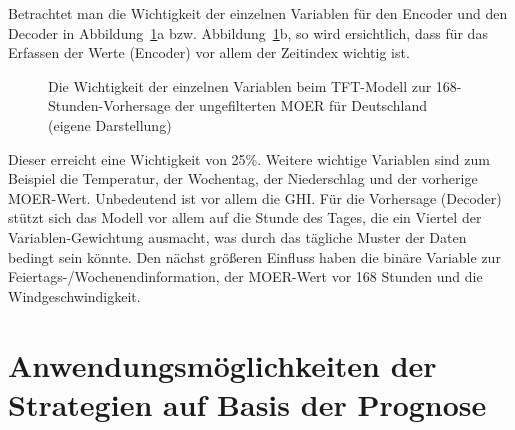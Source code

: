 Betrachtet man die Wichtigkeit der einzelnen Variablen für den Encoder und den Decoder in Abbildung~\ref{FIG:encoder-decoder-interpretation}a bzw. Abbildung~\ref{FIG:encoder-decoder-interpretation}b, so wird ersichtlich, dass für das Erfassen der Werte (Encoder) vor allem der Zeitindex wichtig ist.
\begin{figure}
 \centering
 \qquad
 \caption[TFT Vorhersage Einfluss einzelner Variablen]{Die Wichtigkeit der einzelnen Variablen beim \ac{TFT}-Modell zur 168-Stunden-Vorhersage der ungefilterten \ac{MOER} für Deutschland (eigene Darstellung)}
 \label{FIG:encoder-decoder-interpretation}%
\end{figure}
Dieser erreicht eine Wichtigkeit von 25\%.
Weitere wichtige Variablen sind zum Beispiel die Temperatur, der Wochentag, der Niederschlag und der vorherige \ac{MOER}-Wert.
Unbedeutend ist vor allem die \ac{GHI}.
Für die Vorhersage (Decoder) stützt sich das Modell vor allem auf die Stunde des Tages, die ein Viertel der Variablen-Gewichtung ausmacht, was durch das tägliche Muster der Daten bedingt sein könnte.
Den nächst größeren Einfluss haben die binäre Variable zur Feiertags-/Wochenendinformation, der \ac{MOER}-Wert vor 168 Stunden und die Windgeschwindigkeit.

\chapter{Anwendungsmöglichkeiten der Strategien auf Basis der Prognose}\label{CAP:prediction-application}
